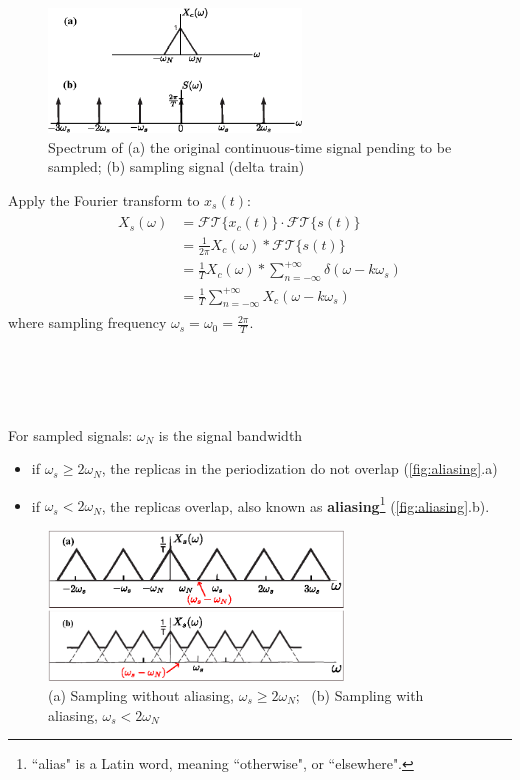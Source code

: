 \begin{minipage}{\textwidth}
\begin{figure}
    \includegraphics[width = 0.6\textwidth]{images/sample_signal_delta_train.eps}
    \caption{Spectrum of (a) the original continuous-time signal pending to be sampled; (b) sampling signal (delta train)}
    \label{fig:original_signal}
\end{figure}
Apply the Fourier transform to  $x_{s}(t)$:
\begin{align*} 
\begin{split}
    X_{s}(\omega) 
    & = \mathcal{FT}\{x_{c}(t)\} \cdot \mathcal{FT}\{s(t)\}\\
    & = \frac{1}{2\pi} X_{c}(\omega) * \mathcal{FT}\{s(t)\} \\
    & = \frac{1}{T} X_{c}(\omega) * \sum_{n=-\infty}^{+\infty} \delta (\omega - k \omega_{s})\\
    & = \boxed{\frac{1}{T} \sum_{n=-\infty}^{+\infty}  X_{c}(\omega - k \omega_{s})}
\end{split} 
\end{align*}
where sampling frequency $\omega_{s}=\omega_{0}=\frac{2\pi}{T}$.
\end{minipage}
\ \\\\\\\\
For sampled signals: $\omega_{N}$ is the signal bandwidth
\begin{itemize}
    \item if $\omega_{s} \geq 2\omega_{N}$, the replicas in the periodization do not overlap (\autoref{fig:aliasing}.a)
    \item if $\omega_{s} < 2\omega_{N}$, the replicas overlap, also known as \textbf{aliasing}\footnote{``alias" is a Latin word, meaning ``otherwise", or ``elsewhere".} (\autoref{fig:aliasing}.b).
\end{itemize} 

\begin{figure}[H]
    \centering
    \includegraphics[width = 0.7\textwidth]{images/sampling_aliasing.eps}
    \caption{(a) Sampling without aliasing, $\omega_{s} \geq 2\omega_{N}$; \ (b) Sampling with aliasing, $\omega_{s} < 2\omega_{N}$} 
    \label{fig:aliasing}
\end{figure}

